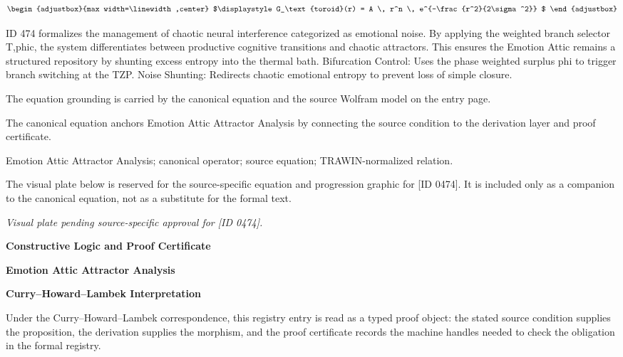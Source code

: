 \[
\begin{adjustbox}{max width=\linewidth,center}
$\displaystyle
G_\text{toroid}(r) = A \, r^n \, e^{-\frac{r^2}{2\sigma^2}}
$
\end{adjustbox}
\]

ID 474 formalizes the management of chaotic neural interference categorized as emotional noise. By applying the weighted branch selector T,phic, the system differentiates between productive cognitive transitions and chaotic attractors. This ensures the Emotion Attic remains a structured repository by shunting excess entropy into the thermal bath. Bifurcation Control: Uses the phase weighted surplus phi to trigger branch switching at the TZP. Noise Shunting: Redirects chaotic emotional entropy to prevent loss of simple closure.

The equation grounding is carried by the canonical equation and the source Wolfram model on the entry page.

The canonical equation anchors Emotion Attic Attractor Analysis by connecting the source condition to the derivation layer and proof certificate.

Emotion Attic Attractor Analysis; canonical operator; source equation; TRAWIN-normalized relation.
\endgroup

\begingroup\footnotesize\sloppy
The visual plate below is reserved for the source-specific equation and progression graphic for [ID 0474]. It is included only as a companion to the canonical equation, not as a substitute for the formal text.
\par\endgroup
\begingroup\footnotesize\itshape
Visual plate pending source-specific approval for [ID 0474].
\par\endgroup

\clearpage
\begingroup\tzpsupportsetup
\noindent\textbf{\fontsize{10.8pt}{12.8pt}\selectfont [ID 0474] Constructive Logic and Proof Certificate}\par
\noindent\textbf{\fontsize{10pt}{12pt}\selectfont Emotion Attic Attractor Analysis}\par
\vspace{0.45em}
\begingroup
\footnotesize
\setlength{\parskip}{0.22em}
\setlength{\parindent}{0pt}
\noindent\textbf{Curry--Howard--Lambek Interpretation}\par
Under the Curry--Howard--Lambek correspondence, this registry entry is read as a typed proof
object: the stated source condition supplies the proposition, the derivation supplies the
morphism, and the proof certificate records the machine handles needed to check the obligation
in the formal registry.

